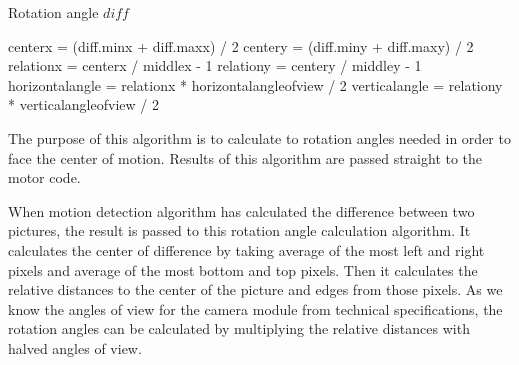 \documentclass[english,11pt,twoside,a4paper]{article}
\begin{document}
\begin{algorithm}
  \label{rotationanglecalc}
  \caption{Rotation angle $diff$}
  \begin{algorithmic}
      \STATE {}
      \STATE centerx = (diff.minx + diff.maxx) / 2
      \STATE centery = (diff.miny + diff.maxy) / 2
        \STATE {}
	\STATE relationx = centerx / middlex - 1
	\STATE relationy = centery / middley - 1
	\STATE {}
	\STATE horizontalangle = relationx * horizontalangleofview / 2
	\STATE verticalangle = relationy * verticalangleofview / 2
      \ENDIF
    \ENDIF
  \end{algorithmic}
\end{algorithm}

The purpose of this algorithm is to calculate to rotation angles needed in order to face the center of motion. Results of this algorithm are passed straight to the motor code.

When motion detection algorithm has calculated the difference between two pictures, the result is passed to this rotation angle calculation algorithm. It calculates the center of difference by taking average of the most left and right pixels and average of the most bottom and top pixels. Then it calculates the relative distances to the center of the picture and edges from those pixels. As we know the angles of view for the camera module from technical specifications, the rotation angles can be calculated by multiplying the relative distances with halved angles of view.
\end{document}
